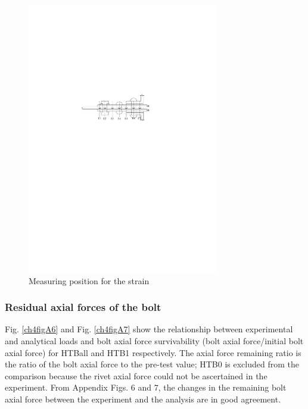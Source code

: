 \begin{figure}[htbp]
    \centering
    \includegraphics[width=0.75\textwidth]{imgs/ch4/figA5.pdf}
    \caption{Measuring position for the strain}
    \label{ch4figA5}
\end{figure}

\subsubsection{Residual axial forces of the bolt}

Fig. \ref{ch4figA6} and Fig. \ref{ch4figA7} show the relationship between experimental and analytical loads and bolt axial force survivability (bolt axial force/initial bolt axial force) for HTBall and HTB1 respectively. The axial force remaining ratio is the ratio of the bolt axial force to the pre-test value; HTB0 is excluded from the comparison because the rivet axial force could not be ascertained in the experiment.
From Appendix Figs. 6 and 7, the changes in the remaining bolt axial force between the experiment and the analysis are in good agreement.

